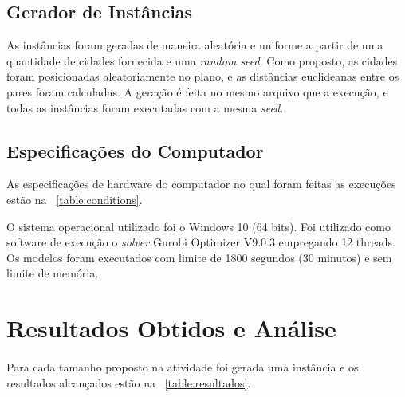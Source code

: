 \documentclass{TEMA}
\begin{document}
\subsection{Gerador de Instâncias}
        As instâncias foram geradas de maneira aleatória e uniforme a partir de uma quantidade de cidades fornecida e uma \textit{random seed}. Como proposto, as cidades foram posicionadas aleatoriamente no plano, e as distâncias euclideanas entre os pares foram calculadas. A geração é feita no mesmo arquivo que a execução, e todas as instâncias foram executadas com a mesma \textit{seed}.
\subsection{Especificações do Computador}
    As especificações de hardware do computador no qual foram feitas as execuções estão na \tablename~\ref{table:conditions}.
    \begin{table}[ht]
        \centering
        \caption{Condições de Execução}
        \label{table:conditions}
        \vspace{0.3cm}
    \end{table}
    
    O sistema operacional utilizado foi o Windows 10 (64 bits). Foi utilizado como software de execução o \textit{solver} Gurobi Optimizer V9.0.3 empregando 12 threads. Os modelos foram executados com limite de 1800 segundos (30 minutos) e sem limite de memória.
\vspace{-0.18cm}
\section{Resultados Obtidos e Análise}
    \paragraph*{}
        Para cada tamanho proposto na atividade foi gerada uma instância e os resultados alcançados estão na \tablename~\ref{table:resultados}.
    
\end{document}

